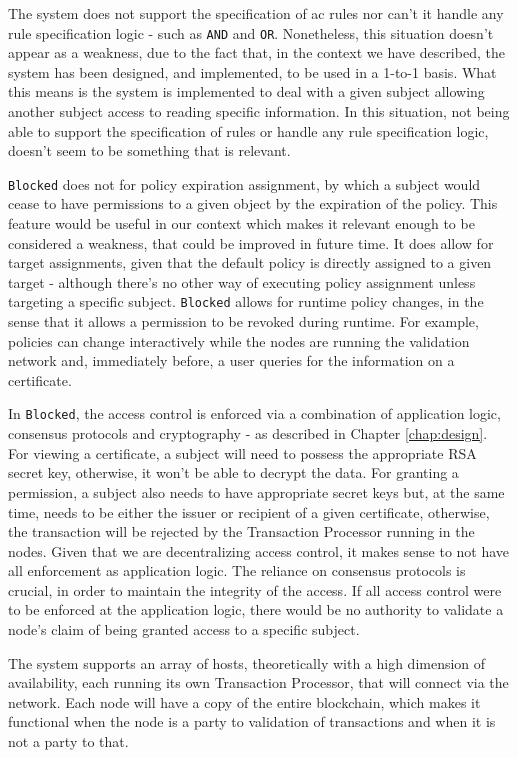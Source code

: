 The system does not support the specification of \gls{ac} rules nor can't it handle any rule specification logic - such as \texttt{AND} and \texttt{OR}. Nonetheless, this situation doesn't appear as a weakness, due to the fact that, in the context we have described, the system has been designed, and implemented, to be used in a 1-to-1 basis. What this means is the system is implemented to deal with a given subject allowing another subject access to reading specific information. In this situation, not being able to support the specification of rules or handle any rule specification logic, doesn't seem to be something that is relevant.

\texttt{Blocked} does not for policy expiration assignment, by which a subject would cease to have permissions to a given object by the expiration of the policy. This feature would be useful in our context which makes it relevant enough to be considered a weakness, that could be improved in future time. It does allow for target assignments, given that the default policy is directly assigned to a given target - although there's no other way of executing policy assignment unless targeting a specific subject. \texttt{Blocked} allows for runtime policy changes, in the sense that it allows a permission to be revoked during runtime. For example, policies can change interactively while the nodes are running the validation network and, immediately before, a user queries for the information on a certificate.

In \texttt{Blocked}, the access control is enforced via a combination of application logic, consensus protocols and cryptography - as described in Chapter \ref{chap:design}. For viewing a certificate, a subject will need to possess the appropriate RSA secret key, otherwise, it won't be able to decrypt the data. For granting a permission, a subject also needs to have appropriate secret keys but, at the same time, needs to be either the issuer or recipient of a given certificate, otherwise, the transaction will be rejected by the Transaction Processor running in the nodes. Given that we are decentralizing access control, it makes sense to not have all enforcement as application logic. The reliance on consensus protocols is crucial, in order to maintain the integrity of the access. If all access control were to be enforced at the application logic, there would be no authority to validate a node's claim of being granted access to a specific subject.

The system supports an array of hosts, theoretically with a high dimension of availability, each running its own Transaction Processor, that will connect via the network. Each node will have a copy of the entire blockchain, which makes it functional when the node is a party to validation of transactions and when it is not a party to that.

